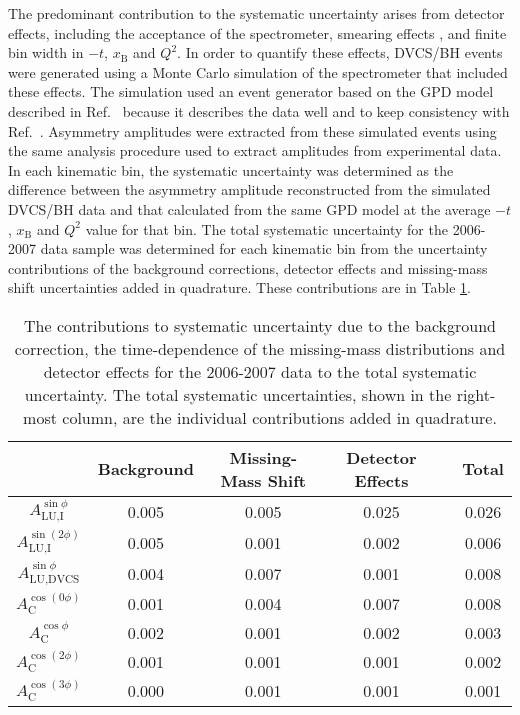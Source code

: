 The predominant contribution to the systematic uncertainty arises from detector
effects, including the acceptance of the spectrometer, smearing effects , and
finite bin width in $-t$, $x_{\textrm{B}}$ and $Q^{2}$. In order to quantify
these effects, DVCS/BH events were generated using a Monte Carlo simulation of
the spectrometer that included these effects. The simulation used an event
generator based on the GPD model described in Ref.~\cite{Guzey2006} because it describes the data well and to keep consistency with Ref.~\cite{2009a}. Asymmetry amplitudes were extracted from these simulated events using the same analysis
procedure used to extract amplitudes from experimental data.  In each kinematic
bin, the systematic uncertainty was determined as the difference between the
asymmetry amplitude reconstructed from the simulated DVCS/BH data and that
calculated from the same GPD model at the average $-t$, $x_{\textrm{B}}$ and
$Q^{2}$ value for that bin.
The total systematic uncertainty for the 2006-2007 data sample was
determined for each kinematic bin from the uncertainty contributions of the
background corrections, detector effects and missing-mass shift
uncertainties added in quadrature. These contributions are  in Table
\ref{table_systematic_contributions_0607}.

\begin{table}[H]
 \begin{center}
\resizebox{16cm}{!} {
 \begin{tabular}{|c|c|c|c|c|c|}
  \hline
 & Background & Missing-Mass Shift & Detector Effects & & Total \\
  \hline
  \hline
  $A_{\textrm{LU,I}}^{\sin\phi}$ & 0.005 & 0.005 & 0.025 & & 0.026 \\
  \hline
  $A_{\textrm{LU,I}}^{\sin(2\phi)}$ & 0.005 & 0.001 & 0.002 & & 0.006 \\
  \hline
  \hline
  $A_{\textrm{LU,DVCS}}^{\sin\phi}$  & 0.004 & 0.007 & 0.001 & & 0.008 \\
  \hline
  \hline
  $A_{\textrm{C}}^{\cos(0\phi)}$ & 0.001 & 0.004 & 0.007 & & 0.008 \\
  \hline
  $A_{\textrm{C}}^{\cos\phi}$ & 0.002 & 0.001 & 0.002 & & 0.003 \\
  \hline
  $A_{\textrm{C}}^{\cos(2\phi)}$ & 0.001 & 0.001 & 0.001 & & 0.002 \\
  \hline
  $A_{\textrm{C}}^{\cos(3\phi)}$ & 0.000 & 0.001 & 0.001 & & 0.001 \\
  \hline
 \end{tabular}
}
  \caption{The contributions to systematic uncertainty due to the
background correction, the time-dependence of the missing-mass
distributions and detector effects for the 2006-2007 data to the total
systematic uncertainty. The total systematic uncertainties, shown in the
right-most column, are the individual contributions added in quadrature.}
  \label{table_systematic_contributions_0607}
\end{center}
\end{table}
